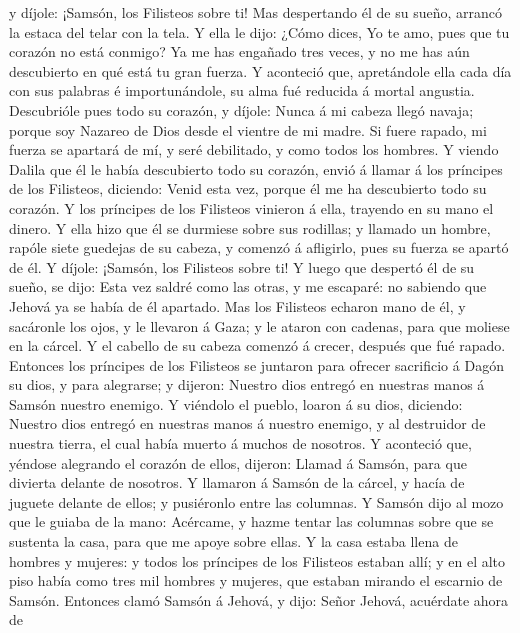 y díjole: ¡Samsón, los Filisteos sobre ti! Mas despertando él de su
sueño, arrancó la estaca del telar con la tela.  Y ella le
dijo: ¿Cómo dices, Yo te amo, pues que tu corazón no está conmigo? Ya me
has engañado tres veces, y no me has aún descubierto en qué está tu gran
fuerza.  Y aconteció que, apretándole ella cada día con sus
palabras é importunándole, su alma fué reducida á mortal angustia.
 Descubrióle pues todo su corazón, y díjole: Nunca á mi
cabeza llegó navaja; porque soy Nazareo de Dios desde el vientre de mi
madre. Si fuere rapado, mi fuerza se apartará de mí, y seré debilitado,
y como todos los hombres.  Y viendo Dalila que él le había
descubierto todo su corazón, envió á llamar á los príncipes de los
Filisteos, diciendo: Venid esta vez, porque él me ha descubierto todo su
corazón. Y los príncipes de los Filisteos vinieron á ella, trayendo en
su mano el dinero.  Y ella hizo que él se durmiese sobre
sus rodillas; y llamado un hombre, rapóle siete guedejas de su cabeza, y
comenzó á afligirlo, pues su fuerza se apartó de él.  Y
díjole: ¡Samsón, los Filisteos sobre ti! Y luego que despertó él de su
sueño, se dijo: Esta vez saldré como las otras, y me escaparé: no
sabiendo que Jehová ya se había de él apartado.  Mas los
Filisteos echaron mano de él, y sacáronle los ojos, y le llevaron á
Gaza; y le ataron con cadenas, para que moliese en la cárcel.
 Y el cabello de su cabeza comenzó á crecer, después que
fué rapado.  Entonces los príncipes de los Filisteos se
juntaron para ofrecer sacrificio á Dagón su dios, y para alegrarse; y
dijeron: Nuestro dios entregó en nuestras manos á Samsón nuestro
enemigo.  Y viéndolo el pueblo, loaron á su dios, diciendo:
Nuestro dios entregó en nuestras manos á nuestro enemigo, y al
destruidor de nuestra tierra, el cual había muerto á muchos de nosotros.
 Y aconteció que, yéndose alegrando el corazón de ellos,
dijeron: Llamad á Samsón, para que divierta delante de nosotros. Y
llamaron á Samsón de la cárcel, y hacía de juguete delante de ellos; y
pusiéronlo entre las columnas.  Y Samsón dijo al mozo que
le guiaba de la mano: Acércame, y hazme tentar las columnas sobre que se
sustenta la casa, para que me apoye sobre ellas.  Y la casa
estaba llena de hombres y mujeres: y todos los príncipes de los
Filisteos estaban allí; y en el alto piso había como tres mil hombres y
mujeres, que estaban mirando el escarnio de Samsón. 
Entonces clamó Samsón á Jehová, y dijo: Señor Jehová, acuérdate ahora de
